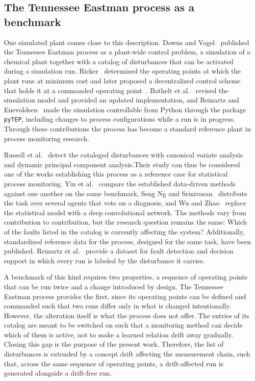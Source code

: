 \subsection{The Tennessee Eastman process as a benchmark} \label{subsec:tep_benchmark}

One simulated plant comes close to this description. Downs and Vogel~\cite{downs.1993} published the Tennessee Eastman process as a plant-wide control problem, a simulation of a chemical plant together with a catalog of disturbances that can be activated during a simulation run. Ricker~\cite{ricker.1995} determined the operating points at which the plant runs at minimum cost and later proposed a decentralized control scheme that holds it at a commanded operating point~\cite{ricker.1996}. Bathelt et al.~\cite{bathelt.2015} revised the simulation model and provided an updated implementation, and Reinartz and Enevoldsen~\cite{reinartz.2022} made the simulation controllable from Python through the package \texttt{pyTEP}, including changes to process configurations while a run is in progress. Through these contributions the process has become a standard reference plant in process monitoring research. \par
%
Russell et al.~\cite{russell.2000} detect the cataloged disturbances with canonical variate analysis and dynamic principal component analysis.Their study can thus be considered one of the works establishing this process as a reference case for statistical process monitoring. Yin et al.~\cite{yin.2012} compare the established data-driven methods against one another on the same benchmark, Seng Ng and Srinivasan~\cite{sengng.2010} distribute the task over several agents that vote on a diagnosis, and Wu and Zhao~\cite{wu.2018} replace the statistical model with a deep convolutional network. The methods vary from contribution to contribution, but the research question remains the same: Which of the faults listed in the catalog is currently affecting the system? Additionally, standardized reference data for the process, designed for the same task, have been published. Reinartz et al.~\cite{reinartz.2021} provide a dataset for fault detection and decision support in which every run is labeled by the disturbance it carries. \par
%
A benchmark of this kind requires two properties, a sequence of operating points that can be run twice and a change introduced by design. The Tennessee Eastman process provides the first, since its operating points can be defined and commanded such that two runs differ only in what is changed intentionally. However, the alteration itself is what the process does not offer. The entries of its catalog are meant to be switched on such that a monitoring method can decide which of them is active, not to make a learned relation drift away gradually. Closing this gap is the purpose of the present work. Therefore, the list of disturbances is extended by a concept drift affecting the measurement chain, such that, across the same sequence of operating points, a drift-affected run is generated alongside a drift-free run. \par
%
